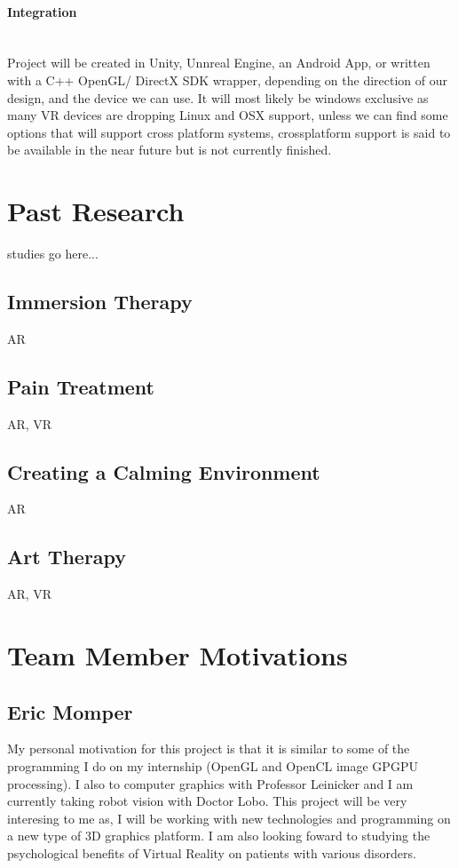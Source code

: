 \documentclass[a4paper,10pt]{article}
\begin{document}
\paragraph{Integration} ~\\ Project will be created in Unity, Unnreal Engine, an Android App, or written with a C++ OpenGL/ DirectX SDK wrapper, depending on the direction of our design, and 
the device we can use. It will most likely be windows exclusive as many VR devices are dropping Linux and OSX support, unless we can find some options that will 
support cross platform systems, crossplatform support is said to be available in the near future but is not currently finished.  

\pagebreak

\section{Past Research}
studies go here...
\subsection{Immersion Therapy}
AR
\subsection{Pain Treatment}
AR, VR
\subsection{Creating a Calming Environment}
AR
\subsection{Art Therapy}
AR, VR
\pagebreak

\section{Team Member Motivations}
\subsection{Eric Momper}
My personal motivation for this project is that it is similar to some of the programming I do on my internship (OpenGL and OpenCL image GPGPU processing).
I also to computer graphics with Professor Leinicker and I am currently taking robot vision with Doctor Lobo. This project will be very interesing to me as, 
I will be working with new technologies and programming on a new type of 3D graphics platform. I am also looking foward to studying the psychological benefits
of Virtual Reality on patients with various disorders.  
\end{document}
